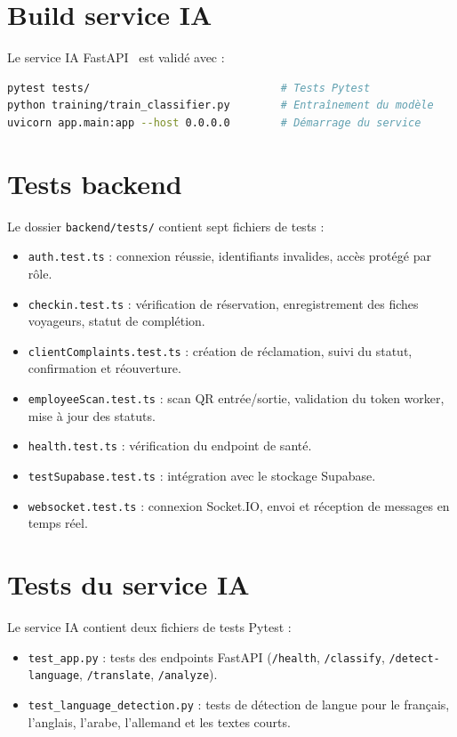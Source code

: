 \section{Build service IA}
Le service IA FastAPI~\cite{fastapi} est validé avec :
\begin{lstlisting}[language=bash,caption={Scripts de validation du service IA}]
pytest tests/                              # Tests Pytest
python training/train_classifier.py        # Entraînement du modèle
uvicorn app.main:app --host 0.0.0.0        # Démarrage du service
\end{lstlisting}

\section{Tests backend}
Le dossier \texttt{backend/tests/} contient sept fichiers de tests :
\begin{itemize}
\item \texttt{auth.test.ts} : connexion réussie, identifiants invalides, accès protégé par rôle.
\item \texttt{checkin.test.ts} : vérification de réservation, enregistrement des fiches voyageurs, statut de complétion.
\item \texttt{clientComplaints.test.ts} : création de réclamation, suivi du statut, confirmation et réouverture.
\item \texttt{employeeScan.test.ts} : scan QR entrée/sortie, validation du token worker, mise à jour des statuts.
\item \texttt{health.test.ts} : vérification du endpoint de santé.
\item \texttt{testSupabase.test.ts} : intégration avec le stockage Supabase.
\item \texttt{websocket.test.ts} : connexion Socket.IO, envoi et réception de messages en temps réel.
\end{itemize}

\section{Tests du service IA}
Le service IA contient deux fichiers de tests Pytest :
\begin{itemize}
\item \texttt{test\_app.py} : tests des endpoints FastAPI (\texttt{/health}, \texttt{/classify}, \texttt{/detect-language}, \texttt{/translate}, \texttt{/analyze}).
\item \texttt{test\_language\_detection.py} : tests de détection de langue pour le français, l'anglais, l'arabe, l'allemand et les textes courts.
\end{itemize}


